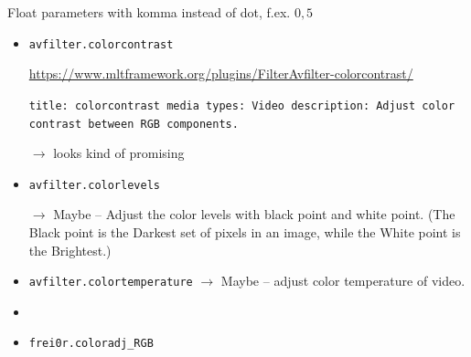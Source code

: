 \documentclass[12pt,a4paper]{article}
\begin{document}
\begin{itemize}
		Float parameters with komma instead of dot, f.ex. $0,5$
		
		\newpage
		
		\begin{itemize}
		
		\item \texttt{avfilter.colorcontrast}
		
		\url{https://www.mltframework.org/plugins/FilterAvfilter-colorcontrast/}
		
		\texttt{title: colorcontrast \newline
			media types: Video \newline
			description: Adjust color contrast between RGB components.}
		
		$\rightarrow$ looks kind of promising
		
		
		
		
		
		
		\item \texttt{avfilter.colorlevels}
		
		$\rightarrow$ Maybe -- Adjust the color levels with black point and white point.
		(The Black point is the Darkest set of pixels in an image, while the White point is the Brightest.)
		
		
		
		
		\item \texttt{avfilter.colortemperature}
		$\rightarrow$ Maybe -- adjust color temperature of video.
		
		
		\item[]
		\item \texttt{frei0r.coloradj\_RGB}
		

\end{itemize}
\end{itemize}
\end{document}
